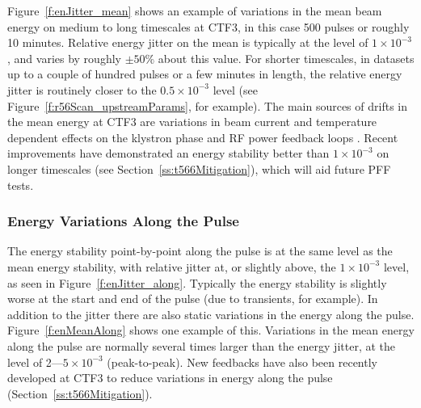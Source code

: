 Figure~\ref{f:enJitter_mean} shows an example of variations in the mean beam energy on medium to long timescales at CTF3, in this case 500 pulses or roughly 10 minutes. Relative energy jitter on the mean is typically at the level of \(1 \times 10^{-3}\), and varies by roughly \(\pm50\%\) about this value. For shorter timescales, in datasets up to a couple of hundred pulses or a few minutes in length, the relative energy jitter is routinely closer to the \(0.5 \times 10^{-3}\) level (see Figure~\ref{f:r56Scan_upstreamParams}, for example). The main sources of drifts in the mean energy at CTF3 are variations in beam current and temperature dependent effects on the klystron phase and RF power feedback loops \cite{lukasIPAC16}. Recent improvements have demonstrated an energy stability better than \(1 \times 10^{-3}\) on longer timescales (see Section~\ref{ss:t566Mitigation}), which will aid future PFF tests.

\subsubsection{Energy Variations Along the Pulse}

The energy stability point-by-point along the pulse is at the same level as the mean energy stability, with relative jitter at, or slightly above, the \(1 \times 10^{-3}\) level, as seen in Figure~\ref{f:enJitter_along}. Typically the energy stability is slightly worse at the start and end of the pulse (due to transients, for example). In addition to the jitter there are also static variations in the energy along the pulse. Figure~\ref{f:enMeanAlong} shows one example of this. Variations in the mean energy along the pulse are normally several times larger than the energy jitter, at the level of 2---\(5\times 10^{-3}\) (peak-to-peak). New feedbacks have also been recently developed at CTF3 to reduce variations in energy along the pulse (Section~\ref{ss:t566Mitigation}).

